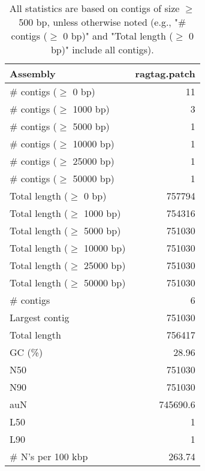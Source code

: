 \documentclass[12pt,a4paper]{article}
\begin{document}
\begin{table}[ht]
\begin{center}
\caption{All statistics are based on contigs of size $\geq$ 500 bp, unless otherwise noted (e.g., "\# contigs ($\geq$ 0 bp)" and "Total length ($\geq$ 0 bp)" include all contigs).}
\begin{tabular}{|l*{1}{|r}|}
\hline
Assembly & ragtag.patch \\ \hline
\# contigs ($\geq$ 0 bp) & 11 \\ \hline
\# contigs ($\geq$ 1000 bp) & 3 \\ \hline
\# contigs ($\geq$ 5000 bp) & 1 \\ \hline
\# contigs ($\geq$ 10000 bp) & 1 \\ \hline
\# contigs ($\geq$ 25000 bp) & 1 \\ \hline
\# contigs ($\geq$ 50000 bp) & 1 \\ \hline
Total length ($\geq$ 0 bp) & 757794 \\ \hline
Total length ($\geq$ 1000 bp) & 754316 \\ \hline
Total length ($\geq$ 5000 bp) & 751030 \\ \hline
Total length ($\geq$ 10000 bp) & 751030 \\ \hline
Total length ($\geq$ 25000 bp) & 751030 \\ \hline
Total length ($\geq$ 50000 bp) & 751030 \\ \hline
\# contigs & 6 \\ \hline
Largest contig & 751030 \\ \hline
Total length & 756417 \\ \hline
GC (\%) & 28.96 \\ \hline
N50 & 751030 \\ \hline
N90 & 751030 \\ \hline
auN & 745690.6 \\ \hline
L50 & 1 \\ \hline
L90 & 1 \\ \hline
\# N's per 100 kbp & 263.74 \\ \hline
\end{tabular}
\end{center}
\end{table}
\end{document}
